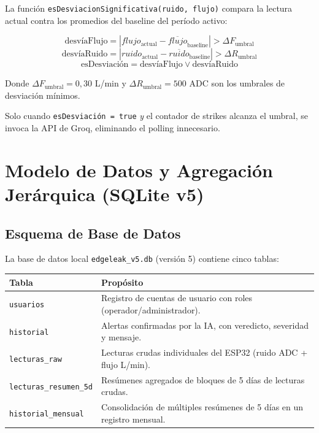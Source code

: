 \documentclass[12pt,a4paper]{article}
\begin{document}
La función \texttt{esDesviacionSignificativa(ruido, flujo)} compara la lectura actual contra los promedios del baseline del período activo:

\begin{equation}
    \text{desvíaFlujo} = |flujo_{\text{actual}} - \overline{flujo}_{\text{baseline}}| > \Delta F_{\text{umbral}}
\end{equation}
\begin{equation}
    \text{desvíaRuido} = |ruido_{\text{actual}} - \overline{ruido}_{\text{baseline}}| > \Delta R_{\text{umbral}}
\end{equation}
\begin{equation}
    \text{esDesviación} = \text{desvíaFlujo} \lor \text{desvíaRuido}
\end{equation}

Donde $\Delta F_{\text{umbral}} = 0{,}30$ L/min y $\Delta R_{\text{umbral}} = 500$ ADC son los umbrales de desviación mínimos.

Solo cuando \texttt{esDesviación = true} \textit{y} el contador de strikes alcanza el umbral, se invoca la API de Groq, eliminando el polling innecesario.

\section{Modelo de Datos y Agregación Jerárquica (SQLite v5)}

\subsection{Esquema de Base de Datos}

La base de datos local \texttt{edgeleak\_v5.db} (versión 5) contiene cinco tablas:

\begin{center}
\begin{tabularx}{0.95\textwidth}{lX}
    \toprule
    \textbf{Tabla} & \textbf{Propósito} \\
    \midrule
    \texttt{usuarios}            & Registro de cuentas de usuario con roles (operador/administrador). \\
    \texttt{historial}           & Alertas confirmadas por la IA, con veredicto, severidad y mensaje. \\
    \texttt{lecturas\_raw}       & Lecturas crudas individuales del ESP32 (ruido ADC + flujo L/min). \\
    \texttt{lecturas\_resumen\_5d} & Resúmenes agregados de bloques de 5 días de lecturas crudas. \\
    \texttt{historial\_mensual}  & Consolidación de múltiples resúmenes de 5 días en un registro mensual. \\
    \bottomrule
\end{tabularx}
\end{center}
\end{document}
